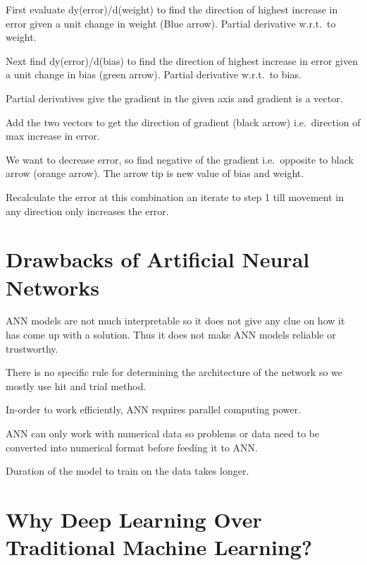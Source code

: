 	\begin{numberedlist}
		\item First evaluate dy(error)/d(weight) to find the direction of highest increase in error given a unit change in weight (Blue arrow). Partial derivative w.r.t.\ to weight.
		\item Next find dy(error)/d(bias) to find the direction of highest increase in error given a unit change in bias (green arrow). Partial derivative w.r.t.\ to bias.
		\item Partial derivatives give the gradient in the given axis and gradient is a vector.
		\item Add the two vectors to get the direction of gradient (black arrow) i.e.\ direction of max increase in error.
		\item We want to decrease error, so find negative of the gradient i.e.\ opposite to black arrow (orange arrow).  The arrow tip is new value of bias and weight.
		\item Recalculate the error at this combination an iterate to step 1 till movement in any direction only increases the error.
	\end{numberedlist}


	\section{Drawbacks of Artificial Neural Networks}

	\begin{bulletedlist}
		\item ANN models are not much interpretable so it does not give any clue on how it has come up with a solution. Thus it does not make ANN models reliable or trustworthy.
		\item There is no specific rule for determining the architecture of the network so we mostly use hit and trial method.
		\item In-order to work efficiently, ANN requires parallel computing power.
		\item ANN can only work with numerical data so problems or data need to be converted into numerical format before feeding it to ANN.
		\item Duration of the model to train on the data takes longer.
	\end{bulletedlist}

	\section{Why Deep Learning Over Traditional Machine Learning?}

